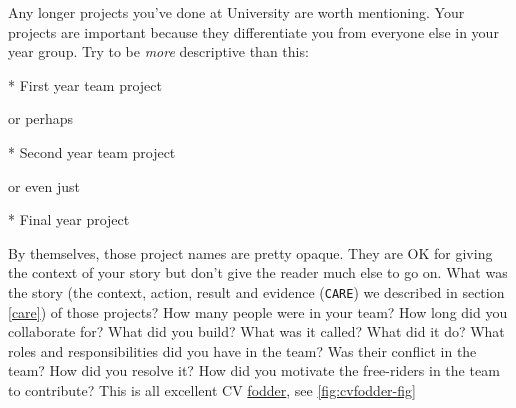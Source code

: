 \documentclass[
]{book}
\newenvironment{Shaded}{\begin{snugshade}}{\end{snugshade}}
\newcommand{\NormalTok}[1]{#1}
\newcommand{\SpecialStringTok}[1]{\textcolor[rgb]{0.31,0.60,0.02}{#1}}
\begin{document}
Any longer projects you've done at University are worth mentioning. Your projects are important because they differentiate you from everyone else in your year group. Try to be \emph{more} descriptive than this:

\begin{Shaded}
\begin{Highlighting}[]
\SpecialStringTok{* }\NormalTok{First year team project}
\end{Highlighting}
\end{Shaded}

or perhaps

\begin{Shaded}
\begin{Highlighting}[]
\SpecialStringTok{* }\NormalTok{Second year team project}
\end{Highlighting}
\end{Shaded}

or even just

\begin{Shaded}
\begin{Highlighting}[]
\SpecialStringTok{* }\NormalTok{Final year project}
\end{Highlighting}
\end{Shaded}

By themselves, those project names are pretty opaque. They are OK for giving the context of your story but don't give the reader much else to go on. What was the story (the context, action, result and evidence (\texttt{CARE}) we described in section \ref{care}) of those projects? How many people were in your team? How long did you collaborate for? What did you build? What was it called? What did it do? What roles and responsibilities did you have in the team? Was their conflict in the team? How did you resolve it? How did you motivate the free-riders in the team to contribute? This is all excellent CV \href{https://en.wikipedia.org/wiki/Fodder}{fodder}, see \ref{fig:cvfodder-fig}
\end{document}
